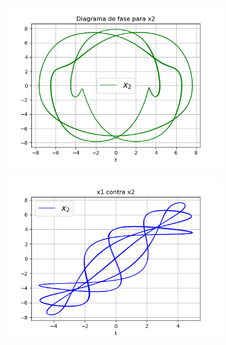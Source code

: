 \documentclass{article}
\begin{document}
\begin{figure}[H]
\centering
\includegraphics[scale=0.59]{32_f2.png}
\end{figure}

\begin{figure}[H]
\centering
\includegraphics[scale=0.59]{32_v.png}
\end{figure}
\end{document}
